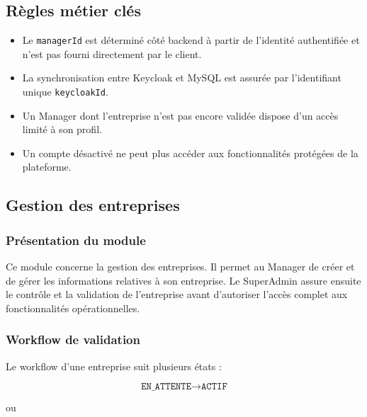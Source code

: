 \documentclass[12pt,a4paper]{report}
\begin{document}
\subsection{Règles métier clés}

\begin{itemize}
  \item Le \texttt{managerId} est déterminé côté backend à partir de
  l'identité authentifiée et n'est pas fourni directement par le client.
  
  \item La synchronisation entre Keycloak et MySQL est assurée par
  l'identifiant unique \texttt{keycloakId}.
  
  \item Un Manager dont l'entreprise n'est pas encore validée dispose
  d'un accès limité à son profil.
  
  \item Un compte désactivé ne peut plus accéder aux fonctionnalités
  protégées de la plateforme.
\end{itemize}



\subsection{Gestion des entreprises}
\label{sec:ch3-sprint2}

\subsubsection{Présentation du module}

Ce module concerne la gestion des entreprises. Il permet
au Manager de créer et de gérer les informations relatives à son entreprise.
Le SuperAdmin assure ensuite le contrôle et la validation de l'entreprise
avant d'autoriser l'accès complet aux fonctionnalités opérationnelles.

\subsubsection{Workflow de validation}

Le workflow d'une entreprise suit plusieurs états :

\[
\texttt{EN\_ATTENTE}
\rightarrow
\texttt{ACTIF}
\]

ou
\end{document}
